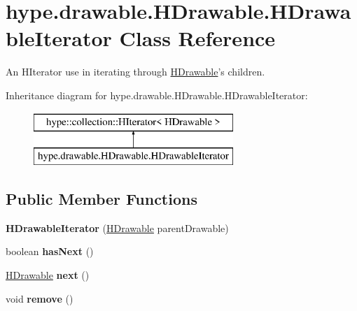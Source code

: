 \hypertarget{classhype_1_1drawable_1_1_h_drawable_1_1_h_drawable_iterator}{\section{hype.\-drawable.\-H\-Drawable.\-H\-Drawable\-Iterator Class Reference}
\label{classhype_1_1drawable_1_1_h_drawable_1_1_h_drawable_iterator}
}


An H\-Iterator use in iterating through \hyperlink{classhype_1_1drawable_1_1_h_drawable}{H\-Drawable}'s children.  


Inheritance diagram for hype.\-drawable.\-H\-Drawable.\-H\-Drawable\-Iterator\-:\begin{figure}[H]
\begin{center}
\leavevmode
\includegraphics[height=2.000000cm]{classhype_1_1drawable_1_1_h_drawable_1_1_h_drawable_iterator}
\end{center}
\end{figure}
\subsection*{Public Member Functions}
\begin{DoxyCompactItemize}
\item 
\hypertarget{classhype_1_1drawable_1_1_h_drawable_1_1_h_drawable_iterator_aa356b83b88b0cd3849b78ff12d596d60}{{\bfseries H\-Drawable\-Iterator} (\hyperlink{classhype_1_1drawable_1_1_h_drawable}{H\-Drawable} parent\-Drawable)}\label{classhype_1_1drawable_1_1_h_drawable_1_1_h_drawable_iterator_aa356b83b88b0cd3849b78ff12d596d60}

\item 
\hypertarget{classhype_1_1drawable_1_1_h_drawable_1_1_h_drawable_iterator_a35ceddbe62525540cc4250e82360677d}{boolean {\bfseries has\-Next} ()}\label{classhype_1_1drawable_1_1_h_drawable_1_1_h_drawable_iterator_a35ceddbe62525540cc4250e82360677d}

\item 
\hypertarget{classhype_1_1drawable_1_1_h_drawable_1_1_h_drawable_iterator_acdbe2dcbb605ea2040148632321367ac}{\hyperlink{classhype_1_1drawable_1_1_h_drawable}{H\-Drawable} {\bfseries next} ()}\label{classhype_1_1drawable_1_1_h_drawable_1_1_h_drawable_iterator_acdbe2dcbb605ea2040148632321367ac}

\item 
\hypertarget{classhype_1_1drawable_1_1_h_drawable_1_1_h_drawable_iterator_a23aef8aa592c78f8fd7883dd3b565f20}{void {\bfseries remove} ()}\label{classhype_1_1drawable_1_1_h_drawable_1_1_h_drawable_iterator_a23aef8aa592c78f8fd7883dd3b565f20}

\end{DoxyCompactItemize}


